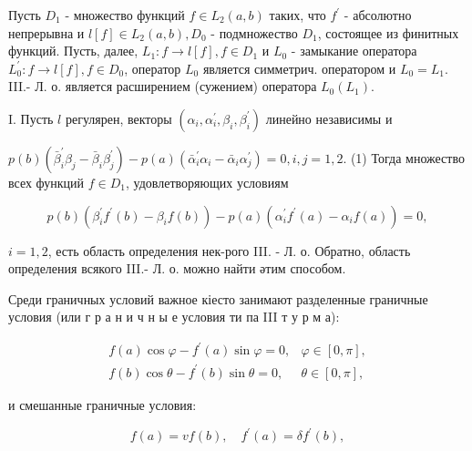 \documentclass[10pt]{article}
\begin{document}
Пусть $D_{1}$ - множество функций $f \in L_{2}(a, b)$ таких, что $f^{\prime}$ - абсолютно непрерывна и $l[f] \in L_{2}(a, b), D_{0}$ - подмножество $D_{1}$, состоящее из финитных функций. Пусть, далее, $L_{1}: f \rightarrow l[f], f \in D_{1}$ и $L_{0}$ - замыкание оператора $L_{0}^{\prime}: f \rightarrow l[f], f \in D_{0}$, оператор $L_{0}$ является симметрич. оператором и $L_{0}=L_{1}$. III.- Л. о. является расширением (сужением) оператора $L_{0}\left(L_{1}\right)$.



I. Пусть $l$ регулярен, векторы $\left(\alpha_{i}, \alpha_{i}^{\prime}, \beta_{i}, \beta_{i}^{\prime}\right)$ линейно независимы и



$p(b)\left(\bar{\beta}_{i}^{\prime} \beta_{j}-\bar{\beta}_{i} \beta_{j}^{\prime}\right)-p(a)\left(\bar{\alpha}_{i}^{\prime} \alpha_{i}-\bar{\alpha}_{i} \alpha_{j}^{\prime}\right)=0, i, j=1,2$. (1) Тогда множество всех функций $f \in D_{1}$, удовлетворяющих условиям



\[

p(b)\left(\beta_{i}^{\prime} f^{\prime}(b)-\beta_{i} f(b)\right)-p(a)\left(\alpha_{i}^{\prime} f^{\prime}(a)-\alpha_{i} f(a)\right)=0,

\]



$i=1,2$, есть область определения нек-рого III. - Л. о. Обратно, область определения всякого III.- Л. о. можно найти әтим способом.



Среди граничных условий важное кіесто занимают разделенные граничные условия (или г р а н и ч н ы е условия ти па III т у р м а):



\[

\begin{array}{ll}

f(a) \cos \varphi-f^{\prime}(a) \sin \varphi=0, & \varphi \in[0, \pi], \\

f(b) \cos \theta-f^{\prime}(b) \sin \theta=0, & \theta \in[0, \pi],

\end{array}

\]



и смешанные граничные условия:



\[

f(a)=v f(b), \quad f^{\prime}(a)=\delta f^{\prime}(b),

\]
\end{document}
